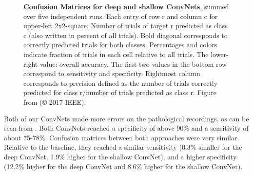 \begin{figure}[htbp]
\myfloatalign
{}\hfill
{}
\caption[Confusion Matrices for deep and shallow ConvNets]{\textbf{Confusion Matrices for deep and shallow ConvNets}, summed over five independent runs.
Each entry of row r and column c for upper-left 2x2-square: Number of trials of target r predicted as class c (also written in percent of all trials).
Bold diagonal corresponds to correctly predicted trials for both classes. Percentages and colors indicate fraction of trials in each cell relative to all trials.
The lower-right value: overall accuracy. The first two values in the bottom row correspond to sensitivity and specificity.
Rightmost column corresponds to precision defined as the number of trials correctly predicted for class r/number of trials predicted as class r. Figure from \citet{schirrmeisterdeeppathology} (© 2017 IEEE).}
\label{conf-mat-pathology-fig}
\end{figure}

    Both of our ConvNets made more errors on the pathological recordings, as
can be seen from . Both
ConvNets reached a specificity of above 90\% and a sensitivity of about
75-78\%. Confusion matrices between both approaches were very similar.
Relative to the baseline, they reached a similar sensitivity (0.3\%
smaller for the deep ConvNet, 1.9\% higher for the shallow ConvNet), and
a higher specificity (12.2\% higher for the deep ConvNet and 8.6\%
higher for the shallow ConvNet).

